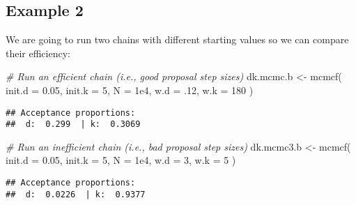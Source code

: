 \documentclass[
]{article}
\newenvironment{Shaded}{\begin{snugshade}}{\end{snugshade}}
\newcommand{\AttributeTok}[1]{\textcolor[rgb]{0.77,0.63,0.00}{#1}}
\newcommand{\CommentTok}[1]{\textcolor[rgb]{0.56,0.35,0.01}{\textit{#1}}}
\newcommand{\DecValTok}[1]{\textcolor[rgb]{0.00,0.00,0.81}{#1}}
\newcommand{\FloatTok}[1]{\textcolor[rgb]{0.00,0.00,0.81}{#1}}
\newcommand{\FunctionTok}[1]{\textcolor[rgb]{0.00,0.00,0.00}{#1}}
\newcommand{\NormalTok}[1]{#1}
\newcommand{\OtherTok}[1]{\textcolor[rgb]{0.56,0.35,0.01}{#1}}
\begin{document}
\hypertarget{example-2-1}{%
\subsection{Example 2}\label{example-2-1}}

We are going to run two chains with different starting values so we can
compare their efficiency:

\begin{Shaded}
\begin{Highlighting}[]
\CommentTok{\# Run an efficient chain (i.e., good proposal step sizes)}
\NormalTok{dk.mcmc.b }\OtherTok{\textless{}{-}} \FunctionTok{mcmcf}\NormalTok{( }\AttributeTok{init.d =} \FloatTok{0.05}\NormalTok{, }\AttributeTok{init.k =} \DecValTok{5}\NormalTok{, }\AttributeTok{N =} \FloatTok{1e4}\NormalTok{,}
                    \AttributeTok{w.d =}\NormalTok{ .}\DecValTok{12}\NormalTok{, }\AttributeTok{w.k =} \DecValTok{180}\NormalTok{ )}
\end{Highlighting}
\end{Shaded}

\begin{verbatim}
## Acceptance proportions:
##  d:  0.299  | k:  0.3069
\end{verbatim}

\begin{Shaded}
\begin{Highlighting}[]
\CommentTok{\# Run an inefficient chain (i.e., bad proposal step sizes)}
\NormalTok{dk.mcmc3.b }\OtherTok{\textless{}{-}} \FunctionTok{mcmcf}\NormalTok{( }\AttributeTok{init.d  =} \FloatTok{0.05}\NormalTok{, }\AttributeTok{init.k =} \DecValTok{5}\NormalTok{, }\AttributeTok{N =} \FloatTok{1e4}\NormalTok{,}
                     \AttributeTok{w.d =} \DecValTok{3}\NormalTok{, }\AttributeTok{w.k =} \DecValTok{5}\NormalTok{ )}
\end{Highlighting}
\end{Shaded}

\begin{verbatim}
## Acceptance proportions:
##  d:  0.0226  | k:  0.9377
\end{verbatim}
\end{document}
